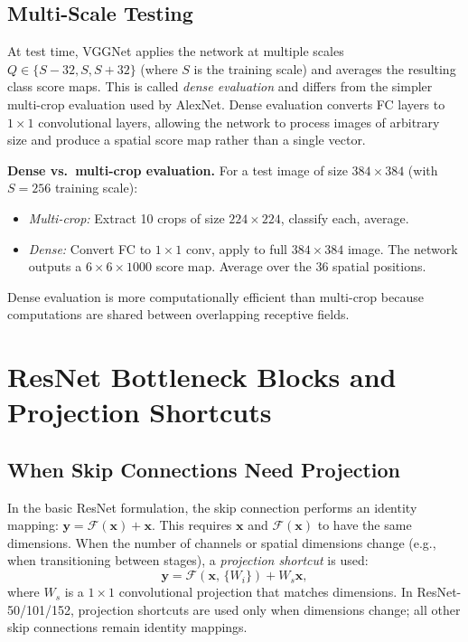 \documentclass[12pt,a4paper]{article}
\begin{document}
\subsection{Multi-Scale Testing}

At test time, VGGNet applies the network at multiple scales $Q \in \{S-32, S, S+32\}$ (where $S$ is the training scale) and averages the resulting class score maps. This is called \emph{dense evaluation} and differs from the simpler multi-crop evaluation used by AlexNet. Dense evaluation converts FC layers to $1\times1$ convolutional layers, allowing the network to process images of arbitrary size and produce a spatial score map rather than a single vector.

\begin{example}
\textbf{Dense vs.\ multi-crop evaluation.}
For a test image of size $384\times384$ (with $S=256$ training scale):
\begin{itemize}[leftmargin=2em]
  \item \emph{Multi-crop:} Extract 10 crops of size $224\times224$, classify each, average.
  \item \emph{Dense:} Convert FC to $1\times1$ conv, apply to full $384\times384$ image. The network outputs a $6\times6\times1000$ score map. Average over the $36$ spatial positions.
\end{itemize}
Dense evaluation is more computationally efficient than multi-crop because computations are shared between overlapping receptive fields.
\end{example}

\section{ResNet Bottleneck Blocks and Projection Shortcuts}
\label{sec:resnet_bottleneck}

\subsection{When Skip Connections Need Projection}

In the basic ResNet formulation, the skip connection performs an identity mapping: $\mathbf{y} = \mathcal{F}(\mathbf{x}) + \mathbf{x}$. This requires $\mathbf{x}$ and $\mathcal{F}(\mathbf{x})$ to have the same dimensions. When the number of channels or spatial dimensions change (e.g., when transitioning between stages), a \emph{projection shortcut} is used:
\begin{equation}
  \mathbf{y} = \mathcal{F}(\mathbf{x},\, \{W_i\}) + W_s \mathbf{x},
  \label{eq:projection_shortcut}
\end{equation}
where $W_s$ is a $1\times1$ convolutional projection that matches dimensions. In ResNet-50/101/152, projection shortcuts are used only when dimensions change; all other skip connections remain identity mappings.
\end{document}
